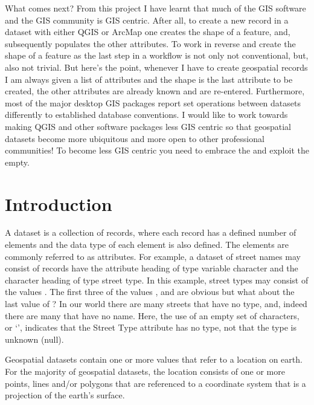 \documentclass[letterpaper,11pt,english]{sphinxmanual}
\begin{document}
What comes next?  From this project I have learnt that much of the GIS software and the GIS community is GIS centric.  After all, to create a new record in a dataset with either QGIS or ArcMap one creates the shape of a feature, and, subsequently populates the other attributes.  To work in reverse and create the shape of a feature as the last step in a workflow is not only not conventional, but, also not trivial.  But here’s the point, whenever I have to create geospatial records I am always given a list of attributes and the shape is the last attribute to be created, the other attributes are already known and are re-entered.  Furthermore, most of the major desktop GIS packages report set operations between datasets differently to established database conventions.  I would like to work towards making QGIS and other software packages less GIS centric so that geospatial datasets become more ubiquitous and more open to other professional communities! To become less GIS centric you need to embrace the  and exploit the empty.


\section{Introduction}
\label{\detokenize{concept:introduction}}
A dataset is a collection of records, where each record has a defined number of elements and the data type of each
element is also defined.  The elements are commonly referred to as attributes.  For example, a dataset of street names
may consist of records have the attribute heading  of type variable character and the character heading
 of type street type.  In this example, street types may consist of the values
.  The first three of the values ,  and  are obvious \textendash{} but what about
the last value of ?    In our world there are many streets that
have no type, and, indeed there are many that have no name.  Here, the use of an empty set of characters, or ‘’,
indicates that the Street Type attribute has no type, not that the type is unknown (null).

Geospatial datasets contain one or more values that refer to a location on earth.  For the majority of geospatial
datasets, the location consists of one or more points, lines and/or polygons that are referenced to a coordinate system
that is a projection of the earth’s surface.
\end{document}

